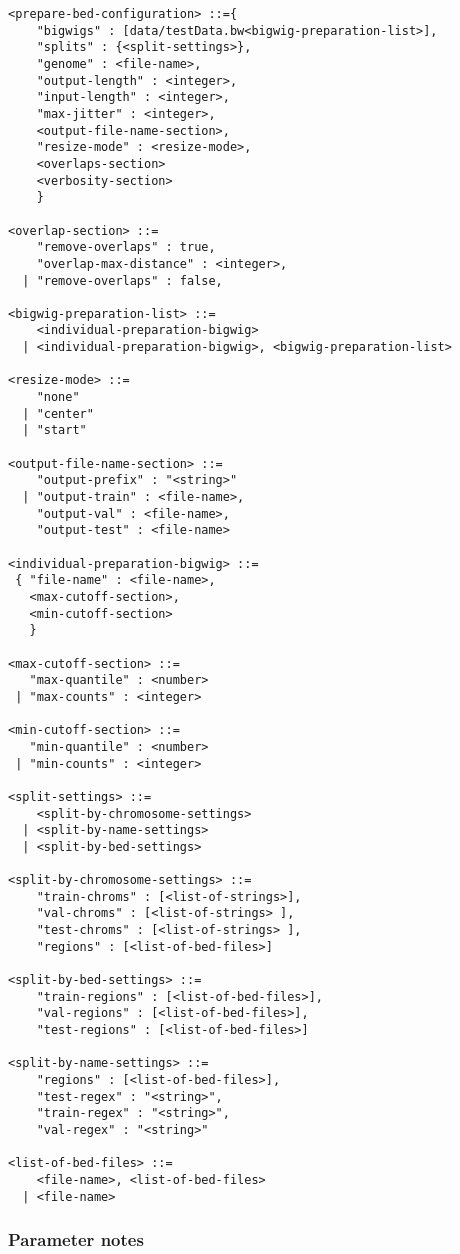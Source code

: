 \documentclass{article}
\begin{document}
\begin{lstlisting}
<prepare-bed-configuration> ::={
    "bigwigs" : [data/testData.bw<bigwig-preparation-list>],
    "splits" : {<split-settings>},
    "genome" : <file-name>,
    "output-length" : <integer>,
    "input-length" : <integer>,
    "max-jitter" : <integer>,
    <output-file-name-section>,
    "resize-mode" : <resize-mode>,
    <overlaps-section>
    <verbosity-section>
    }

<overlap-section> ::=
    "remove-overlaps" : true,
    "overlap-max-distance" : <integer>,
  | "remove-overlaps" : false,

<bigwig-preparation-list> ::=
    <individual-preparation-bigwig>
  | <individual-preparation-bigwig>, <bigwig-preparation-list>

<resize-mode> ::=
    "none"
  | "center"
  | "start"

<output-file-name-section> ::=
    "output-prefix" : "<string>"
  | "output-train" : <file-name>,
    "output-val" : <file-name>,
    "output-test" : <file-name>

<individual-preparation-bigwig> ::=
 { "file-name" : <file-name>,
   <max-cutoff-section>,
   <min-cutoff-section>
   }

<max-cutoff-section> ::=
   "max-quantile" : <number>
 | "max-counts" : <integer>

<min-cutoff-section> ::=
   "min-quantile" : <number>
 | "min-counts" : <integer>

<split-settings> ::=
    <split-by-chromosome-settings>
  | <split-by-name-settings>
  | <split-by-bed-settings>

<split-by-chromosome-settings> ::=
    "train-chroms" : [<list-of-strings>],
    "val-chroms" : [<list-of-strings> ],
    "test-chroms" : [<list-of-strings> ],
    "regions" : [<list-of-bed-files>]

<split-by-bed-settings> ::=
    "train-regions" : [<list-of-bed-files>],
    "val-regions" : [<list-of-bed-files>],
    "test-regions" : [<list-of-bed-files>]

<split-by-name-settings> ::=
    "regions" : [<list-of-bed-files>],
    "test-regex" : "<string>",
    "train-regex" : "<string>",
    "val-regex" : "<string>"

<list-of-bed-files> ::=
    <file-name>, <list-of-bed-files>
  | <file-name>

\end{lstlisting}

\subsubsection{Parameter notes}
\end{document}
